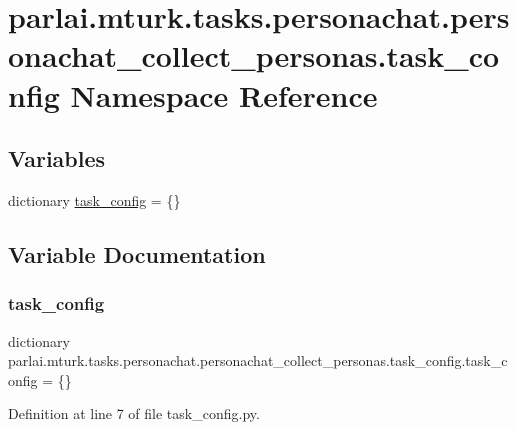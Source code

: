 \hypertarget{namespaceparlai_1_1mturk_1_1tasks_1_1personachat_1_1personachat__collect__personas_1_1task__config}{}\section{parlai.\+mturk.\+tasks.\+personachat.\+personachat\+\_\+collect\+\_\+personas.\+task\+\_\+config Namespace Reference}
\label{namespaceparlai_1_1mturk_1_1tasks_1_1personachat_1_1personachat__collect__personas_1_1task__config}
\subsection*{Variables}
\begin{DoxyCompactItemize}
\item 
dictionary \hyperlink{namespaceparlai_1_1mturk_1_1tasks_1_1personachat_1_1personachat__collect__personas_1_1task__config_aaaae857e509e595d9b4d876eb763ebf3}{task\+\_\+config} = \{\}
\end{DoxyCompactItemize}


\subsection{Variable Documentation}
\mbox{\label{namespaceparlai_1_1mturk_1_1tasks_1_1personachat_1_1personachat__collect__personas_1_1task__config_aaaae857e509e595d9b4d876eb763ebf3}} 
\subsubsection{\texorpdfstring{task\+\_\+config}{task\_config}}
{\footnotesize\ttfamily dictionary parlai.\+mturk.\+tasks.\+personachat.\+personachat\+\_\+collect\+\_\+personas.\+task\+\_\+config.\+task\+\_\+config = \{\}}



Definition at line 7 of file task\+\_\+config.\+py.

